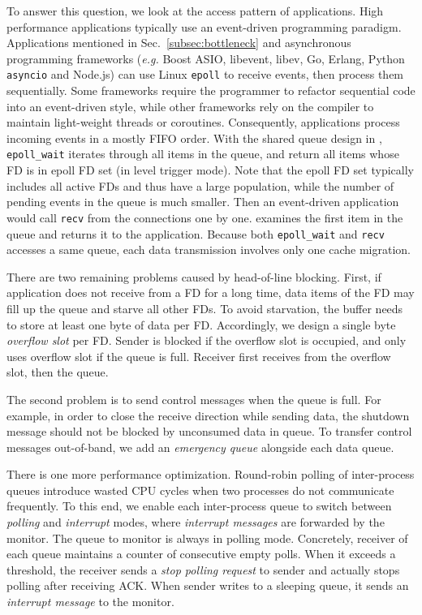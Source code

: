 To answer this question, we look at the access pattern of applications. High performance applications typically use an event-driven programming paradigm. Applications mentioned in Sec.~\ref{subsec:bottleneck} and asynchronous programming frameworks (\textit{e.g.} Boost ASIO, libevent, libev, Go, Erlang, Python \texttt{asyncio} and Node.js) can use Linux \texttt{epoll} to receive events, then process them sequentially. Some frameworks require the programmer to refactor sequential code into an event-driven style, while other frameworks rely on the compiler to maintain light-weight threads or coroutines. Consequently, applications process incoming events in a mostly FIFO order. With the shared queue design in \libipc{}, \texttt{epoll\_wait} iterates through all items in the queue, and return all items whose FD is in epoll FD set (in level trigger mode). Note that the epoll FD set typically includes all active FDs and thus have a large population, while the number of pending events in the queue is much smaller. Then an event-driven application would call \texttt{recv} from the connections one by one. \libipc{} examines the first item in the queue and returns it to the application. Because both \texttt{epoll\_wait} and \texttt{recv} accesses a same queue, each data transmission involves only one cache migration.

There are two remaining problems caused by head-of-line blocking. First, if application does not receive from a FD for a long time, data items of the FD may fill up the queue and starve all other FDs. To avoid starvation, the buffer needs to store at least one byte of data per FD. Accordingly, we design a single byte \textit{overflow slot} per FD. Sender is blocked if the overflow slot is occupied, and only uses overflow slot if the queue is full. Receiver first receives from the overflow slot, then the queue.

The second problem is to send control messages when the queue is full. For example, in order to close the receive direction while sending data, the shutdown message should not be blocked by unconsumed data in queue. To transfer control messages out-of-band, we add an \textit{emergency queue} alongside each data queue.

There is one more performance optimization. Round-robin polling of inter-process queues introduce wasted CPU cycles when two processes do not communicate frequently. To this end, we enable each inter-process queue to switch between \textit{polling} and \textit{interrupt} modes, where \textit{interrupt messages} are forwarded by the monitor. The queue to monitor is always in polling mode. Concretely, receiver of each queue maintains a counter of consecutive empty polls. When it exceeds a threshold, the receiver sends a \textit{stop polling request} to sender and actually stops polling after receiving ACK. When sender writes to a sleeping queue, it sends an \textit{interrupt message} to the monitor.

